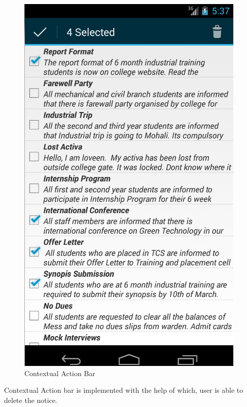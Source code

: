 \begin{figure}[H]
\centering \includegraphics[scale=0.7]{image/context.png}
\caption{Contextual Action Bar}
\end{figure}
Contextual Action bar is implemented with the help of which, user is able to delete the notice.


